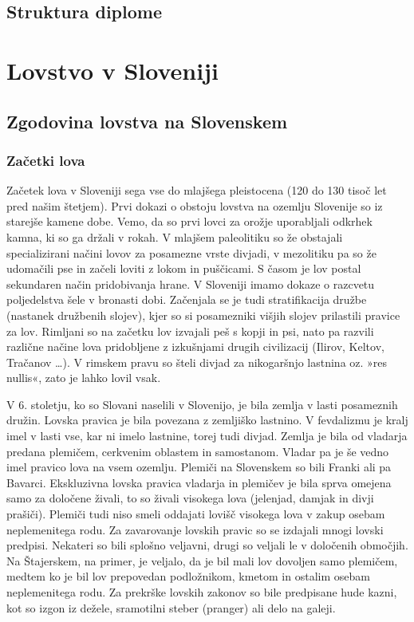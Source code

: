 \documentclass[a4paper,12pt,openright]{book}
\begin{document}
\section{Struktura diplome}

\chapter{Lovstvo v Sloveniji}
\label{ch0}

\section{Zgodovina lovstva na Slovenskem}

\subsection{Začetki lova}

Začetek lova v Sloveniji sega vse do mlajšega pleistocena (120 do 130 tisoč let pred našim štetjem). 
Prvi dokazi o obstoju lovstva na ozemlju Slovenije so iz starejše kamene dobe. Vemo, da so prvi lovci za orožje uporabljali odkrhek kamna, ki so ga držali v rokah. 
V mlajšem paleolitiku so že obstajali specializirani načini lovov za posamezne vrste divjadi, v mezolitiku pa so že udomačili pse in začeli loviti z lokom in puščicami. 
S časom je lov postal sekundaren način pridobivanja hrane. 
V Sloveniji imamo dokaze o razcvetu poljedelstva šele v bronasti dobi. Začenjala se je tudi stratifikacija družbe (nastanek družbenih slojev), kjer so si posamezniki višjih slojev prilastili pravice za lov. 
Rimljani so na začetku lov izvajali peš s kopji in psi, nato pa razvili različne načine lova pridobljene z izkušnjami drugih civilizacij (Ilirov, Keltov, Tračanov …). 
V rimskem pravu so šteli divjad za nikogaršnjo lastnina oz. »res nullis«, zato je lahko lovil vsak.

V 6. stoletju, ko so Slovani naselili v Slovenijo, je bila zemlja v lasti posameznih družin. 
Lovska pravica je bila povezana z zemljiško lastnino. 
V fevdalizmu je kralj imel v lasti vse, kar ni imelo lastnine, torej tudi divjad. Zemlja je bila od vladarja predana plemičem, cerkvenim oblastem in samostanom. 
Vladar pa je še vedno imel pravico lova na vsem ozemlju. Plemiči na Slovenskem so bili Franki ali pa Bavarci. 
Ekskluzivna lovska pravica vladarja in plemičev je bila sprva omejena samo za določene živali, to so živali visokega lova (jelenjad, damjak in divji prašiči). 
Plemiči tudi niso smeli oddajati lovišč visokega lova v zakup osebam neplemenitega rodu. Za zavarovanje lovskih pravic so se izdajali mnogi lovski predpisi. 
Nekateri so bili splošno veljavni, drugi so veljali le v določenih območjih. 
Na Štajerskem, na primer, je veljalo, da je bil mali lov dovoljen samo plemičem, medtem ko je bil lov prepovedan podložnikom, kmetom in ostalim osebam neplemenitega rodu. 
Za prekrške lovskih zakonov so bile predpisane hude kazni, kot so izgon iz dežele, sramotilni steber (pranger) ali delo na galeji.
\end{document}
